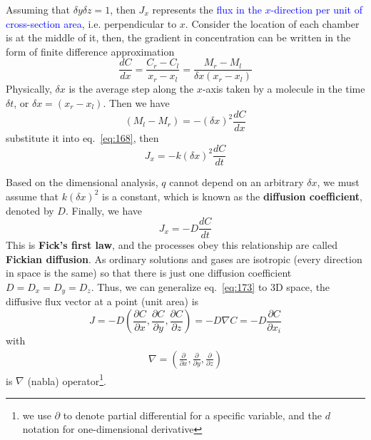 Assuming that $\delta y \delta z = 1$, then $J_x$ represents the
\textcolor{blue}{flux in the $x$-direction per unit of cross-section
  area},
i.e.  perpendicular to $x$.  Consider the location of each chamber is
at the middle of it, then, the gradient in concentration can be
written in the form of finite difference approximation
\begin{equation}
  \label{eq:170}
  \frac{dC}{dx} = \frac{C_r-C_l}{x_r-x_l} = \frac{M_r-M_l}{\delta x (x_r-x_l)}
\end{equation}
Physically, $\delta x$ is
the average step along the $x$-axis taken by a molecule in the time
$\delta t$, or  $\delta x = (x_r-x_l)$. Then we have
\begin{equation}
  \label{eq:171}
  (M_l-M_r) = - (\delta x)^2 \frac{dC}{dx}
\end{equation}
substitute it into eq.~\eqref{eq:168}, then
\begin{equation}
  \label{eq:172}
  J_x = -k(\delta x)^2 \frac{dC}{dt}
\end{equation}

Based on the dimensional analysis,  $q$ cannot depend on an arbitrary
$\delta x$, we must assume that $k(\delta x)^2$ is a constant, which
is known as the {\bf diffusion coefficient}, denoted by $D$. Finally,
we have
\begin{equation}
  \label{eq:173}
  J_x = -D\frac{dC}{dt}
\end{equation}
This is {\bf Fick's first law}, and the processes obey this
relationship are called {\bf Fickian diffusion}.  As ordinary
solutions and gases are isotropic (every direction in space is the
same) so that there is just one diffusion coefficient
$D=D_x=D_y=D_z$. Thus, we can generalize eq.~\eqref{eq:173} to 3D
space, the diffusive flux vector at a point (unit area) is
\begin{equation}
  \label{eq:174}
  J = -D (\frac{\partial C}{\partial x}, \frac{\partial C}{\partial
    y}, \frac{\partial C}{\partial z}) = -D \nabla C =
  -D\frac{\partial C}{\partial x_i}
\end{equation}
with 
\begin{eqnarray*}
  \nabla = \left( \frac{\partial}{\partial x},
    \frac{\partial}{\partial y}, \frac{\partial}{\partial z} \right)
\end{eqnarray*}
is $\nabla$ (nabla)
operator\footnote{we use $\partial$ to denote partial differential for
  a specific variable, and the $d$ notation for one-dimensional
  derivative}.


